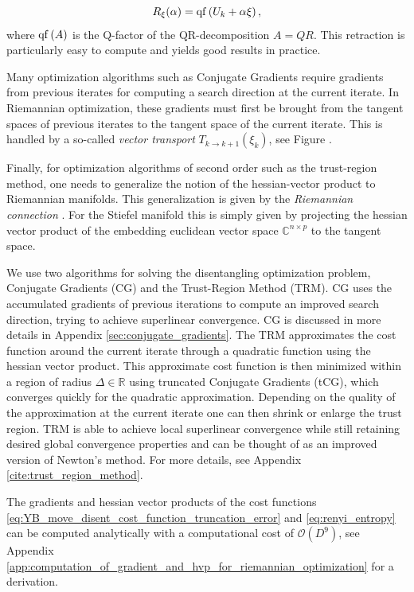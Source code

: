 \begin{equation}
	R_\xi(\alpha) = \operatorname{qf}\left(U_k + \alpha\xi\right),
\end{equation}
where $\operatorname{qf}\left(A\right)$ is the Q-factor of the QR-decomposition $A = QR$. This retraction is particularly easy to compute and yields good results in practice. \par
Many optimization algorithms such as Conjugate Gradients require gradients from previous iterates for computing a search direction at the current iterate. In Riemannian optimization, these gradients must first be brought from the tangent spaces of previous iterates to the tangent space of the current iterate. This is handled by a so-called \textit{vector transport} $T_{k\rightarrow k+1}\left(\xi_k\right)$, see Figure . \par
Finally, for optimization algorithms of second order such as the trust-region method, one needs to generalize the notion of the hessian-vector product to Riemannian manifolds. This generalization is given by the \textit{Riemannian connection} \cite{cite:optimization_on_matrix_manifolds}. For the Stiefel manifold this is simply given by projecting the hessian vector product of the embedding euclidean vector space $\mathbb{C}^{n\times p}$ to the tangent space. \par
We use two algorithms for solving the disentangling optimization problem, Conjugate Gradients (CG) and the Trust-Region Method (TRM). CG uses the accumulated gradients of previous iterations to compute an improved search direction, trying to achieve superlinear convergence. CG is discussed in more details in Appendix \ref{sec:conjugate_gradients}. The TRM approximates the cost function around the current iterate through a quadratic function using the hessian vector product. This approximate cost function is then minimized within a region of radius $\Delta\in\mathbb{R}$ using truncated Conjugate Gradients (tCG), which converges quickly for the quadratic approximation. Depending on the quality of the approximation at the current iterate one can then shrink or enlarge the trust region. TRM is able to achieve local superlinear convergence while still retaining desired global convergence properties \cite{cite:optimization_on_matrix_manifolds} and can be thought of as an improved version of Newton's method. For more details, see Appendix \ref{cite:trust_region_method}. \par
The gradients and hessian vector products of the cost functions \eqref{eq:YB_move_disent_cost_function_truncation_error} and \eqref{eq:renyi_entropy} can be computed analytically with a computational cost of $\mathcal{O}(D^9)$, see Appendix \ref{app:computation_of_gradient_and_hvp_for_riemannian_optimization} for a derivation.
